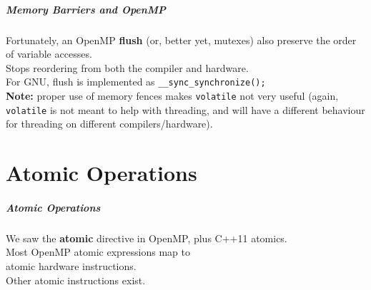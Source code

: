 \documentclass[aspectratio=43]{beamer}
\newenvironment{changemargin}[1]{%
  \begin{list}{}{%
    \setlength{\topsep}{0pt}%
    \setlength{\leftmargin}{#1}%
    \setlength{\rightmargin}{1em}
    \setlength{\listparindent}{\parindent}%
    \setlength{\itemindent}{\parindent}%
    \setlength{\parsep}{\parskip}%
  }%
  \item[]}{\end{list}}
\begin{document}
  
\begin{frame}
  \frametitle{Memory Barriers and OpenMP}

  \begin{changemargin}{1.5cm}
    Fortunately, an OpenMP {\bf flush} (or, better yet, mutexes) also preserve the order of variable accesses.\\[1em]
    Stops reordering from both the compiler and hardware.\\[1em]
    For GNU, flush is implemented as
      {\tt \_\_sync\_synchronize();}\\[1em]

  {\bf Note:} proper use of memory fences makes {\tt volatile} not very
  useful (again, {\tt volatile} is not meant to help with threading, and will
  have a different behaviour for threading on different compilers/hardware).
  \end{changemargin}
\end{frame}

\part{Atomic Operations}
\frame{\partpage}

\begin{frame}
  \frametitle{Atomic Operations}

  \begin{changemargin}{1.5cm}

 We saw the {\bf atomic} directive in OpenMP, plus C++11 atomics.\\[1em]

 Most OpenMP atomic expressions map to\\ atomic hardware instructions.\\[1em]

 Other atomic instructions exist.
  \end{changemargin}

\end{frame}
\end{document}
